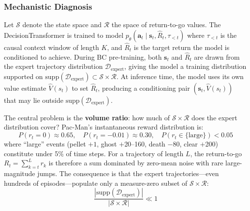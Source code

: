 \documentclass[11pt,a4paper]{article}
\theoremstyle{definition}
\begin{document}
\subsubsection{Mechanistic Diagnosis}

Let $\mathcal{S}$ denote the state space and $\mathcal{R}$ the space of return-to-go values.
The DecisionTransformer is trained to model $p_\theta(\mathbf{a}_t \mid \mathbf{s}_t, \hat{R}_t, \tau_{<t})$ where $\tau_{<t}$ is the causal context window of length $K$, and $\hat{R}_t$ is the target return the model is conditioned to achieve.
During BC pre-training, both $\mathbf{s}_t$ and $\hat{R}_t$ are drawn from the expert trajectory distribution $\mathcal{D}_{\text{expert}}$, giving the model a training distribution supported on $\text{supp}(\mathcal{D}_{\text{expert}}) \subset \mathcal{S} \times \mathcal{R}$.
At inference time, the model uses its own value estimate $\hat{V}(s_t)$ to set $\hat{R}_t$, producing a conditioning pair $(\mathbf{s}_t, \hat{V}(s_t))$ that may lie outside $\text{supp}(\mathcal{D}_{\text{expert}})$.

The central problem is the \textbf{volume ratio}: how much of $\mathcal{S} \times \mathcal{R}$ does the expert distribution cover?
Pac-Man's instantaneous reward distribution is:
\begin{equation}
P(r_t = 0) \approx 0.65,\quad P(r_t = -0.01) \approx 0.30,\quad P(r_t \in \{\text{large}\}) < 0.05
\end{equation}
where ``large'' events (pellet $+1$, ghost $+$20--160, death $-80$, clear $+$200) constitute under 5\% of time steps.
For a trajectory of length $L$, the return-to-go $R_t = \sum_{k=t}^L r_k$ is therefore a sum dominated by zero-mean noise with rare large-magnitude jumps.
The consequence is that the expert trajectories---even hundreds of episodes---populate only a measure-zero subset of $\mathcal{S} \times \mathcal{R}$:
\begin{equation}
\frac{|\text{supp}(\mathcal{D}_{\text{expert}})|}{|\mathcal{S} \times \mathcal{R}|} \ll 1
\end{equation}
\end{document}
